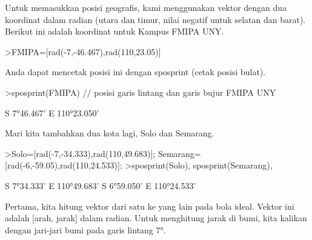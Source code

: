 \documentclass[a4paper,10pt]{article}
\begin{document}
\begin{eulernotebook}
\begin{eulercomment}
\begin{eulercomment}
\begin{eulercomment}
\begin{eulercomment}
\begin{eulercomment}
\begin{eulercomment}
\begin{eulercomment}
\begin{eulercomment}
\begin{eulercomment}
\begin{eulercomment}
\begin{eulercomment}
\begin{eulercomment}
\begin{eulercomment}
\begin{eulercomment}
\begin{eulercomment}
\begin{eulercomment}
\begin{eulercomment}
\begin{eulercomment}
\begin{eulercomment}
\begin{eulercomment}
\begin{eulercomment}
\begin{eulercomment}
\begin{eulercomment}
\begin{eulercomment}
\begin{eulercomment}
\begin{eulercomment}
\begin{eulercomment}
\begin{eulercomment}
\begin{eulercomment}
\begin{eulercomment}
\begin{eulercomment}
\begin{eulercomment}
\begin{eulercomment}
\begin{eulercomment}
\begin{eulercomment}
Untuk memasukkan posisi geografis, kami menggunakan vektor dengan dua
koordinat dalam radian (utara dan timur, nilai negatif untuk selatan
dan barat). Berikut ini adalah koordinat untuk Kampus FMIPA UNY.
\end{eulercomment}
\begin{eulerprompt}
>FMIPA=[rad(-7,-46.467),rad(110,23.05)]
\end{eulerprompt}
\begin{euleroutput}
  [-0.13569,  1.92657]
\end{euleroutput}
\begin{eulercomment}
Anda dapat mencetak posisi ini dengan sposprint (cetak posisi bulat).
\end{eulercomment}
\begin{eulerprompt}
>sposprint(FMIPA) // posisi garis lintang dan garis bujur FMIPA UNY
\end{eulerprompt}
\begin{euleroutput}
  S 7°46.467' E 110°23.050'
\end{euleroutput}
\begin{eulercomment}
Mari kita tambahkan dua kota lagi, Solo dan Semarang.
\end{eulercomment}
\begin{eulerprompt}
>Solo=[rad(-7,-34.333),rad(110,49.683)]; Semarang=[rad(-6,-59.05),rad(110,24.533)];
>sposprint(Solo), sposprint(Semarang),
\end{eulerprompt}
\begin{euleroutput}
  S 7°34.333' E 110°49.683'
  S 6°59.050' E 110°24.533'
\end{euleroutput}
\begin{eulercomment}
Pertama, kita hitung vektor dari satu ke yang lain pada bola ideal.
Vektor ini adalah [arah, jarak] dalam radian. Untuk menghitung jarak
di bumi, kita kalikan dengan jari-jari bumi pada garis lintang 7°.

\end{eulercomment}
\end{eulercomment}
\end{eulercomment}
\end{eulercomment}
\end{eulercomment}
\end{eulercomment}
\end{eulercomment}
\end{eulercomment}
\end{eulercomment}
\end{eulercomment}
\end{eulercomment}
\end{eulercomment}
\end{eulercomment}
\end{eulercomment}
\end{eulercomment}
\end{eulercomment}
\end{eulercomment}
\end{eulercomment}
\end{eulercomment}
\end{eulercomment}
\end{eulercomment}
\end{eulercomment}
\end{eulercomment}
\end{eulercomment}
\end{eulercomment}
\end{eulercomment}
\end{eulercomment}
\end{eulercomment}
\end{eulercomment}
\end{eulercomment}
\end{eulercomment}
\end{eulercomment}
\end{eulercomment}
\end{eulercomment}
\end{eulercomment}
\end{eulernotebook}
\end{document}

